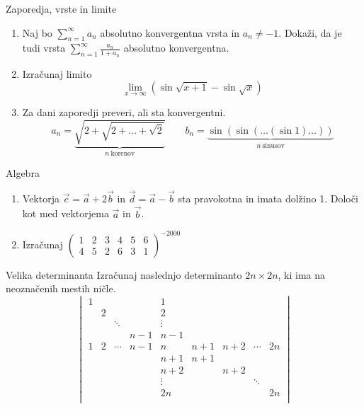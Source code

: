 \begin{frame}{Zaporedja, vrste in limite}
	\begin{enumerate}
		\item 
		Naj bo $\sum_{n=1}^{\infty}a_n$ absolutno konvergentna vrsta in $a_n \ne -1$.
		Dokaži, da je tudi vrsta $\sum_{n=1}^\infty \frac{a_n}{1+a_n}$
		absolutno konvergentna.

		\item
		Izračunaj limito
		$$\lim_{x\to\infty}(\sin\sqrt{x+1}-\sin\sqrt{x})$$

		\item
		Za dani zaporedji preveri, ali sta konvergentni.
		$$
		a_n =\underbrace{\sqrt{2+\sqrt{2+\dots+\sqrt{2}}}}_{n~\text{korenov}}  \qquad
		b_n = \underbrace{\sin(\sin(\dots(\sin 1)\dots))}_{n~\text{sinusov}}
		$$
	\end{enumerate}
\end{frame}

\begin{frame}{Algebra}
	\begin{enumerate}
		\item
		Vektorja $\vec{c}=\vec{a}+2\vec{b}$ in $\vec{d}=\vec{a}-\vec{b}$
		sta pravokotna in imata dolžino 1. Določi kot med vektorjema $\vec{a}$ in $\vec{b}$.
		\item 
		Izračunaj
		$
		\begin{pmatrix}
			1&2&3&4&5&6 \\ 
			4&5&2&6&3&1
		\end{pmatrix}^{-2000}
		$
	\end{enumerate}
\end{frame}

\begin{frame}{Velika determinanta}
	Izračunaj naslednjo determinanto $2n \times 2n$, ki ima na neoznačenih mestih ničle.
	$$
	\begin{vmatrix}
		1&&&&1 \\
		&2&&&2 \\
		&& \ddots && \vdots \\
		&&& n-1 & n-1 \\
		1 & 2 & \cdots & n-1 & n & n+1 & n+2 & \cdots & 2n \\
		&&&& n+1 & n+1 & \\
		&&&& n+2 && n+2 \\
		&&&& \vdots &&& \ddots \\
		&&&& 2n &&&& 2n \\


	\end{vmatrix}
	$$
\end{frame}

